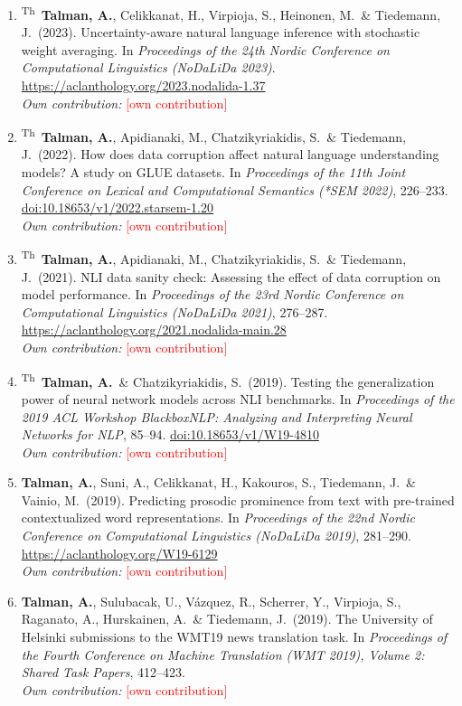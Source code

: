 \documentclass[12pt,a4paper]{article}
\newcommand{\fillin}[1]{\textcolor{red}{[#1]}}
\newcommand{\me}{\textbf{Talman, A.}}
\newcommand{\thesis}{\textsuperscript{Th}}    %
\newcommand{\contrib}[1]{\\\textit{Own contribution:} #1}
\begin{document}
\begin{enumerate}[resume*=pubs]
  \item \thesis\ \me, Celikkanat, H., Virpioja, S., Heinonen, M.\ \& Tiedemann, J.\ (2023). Uncertainty-aware natural language inference with stochastic weight averaging. In \emph{Proceedings of the 24th Nordic Conference on Computational Linguistics (NoDaLiDa 2023)}. \url{https://aclanthology.org/2023.nodalida-1.37}
  \contrib{\fillin{own contribution}}

  \item \thesis\ \me, Apidianaki, M., Chatzikyriakidis, S.\ \& Tiedemann, J.\ (2022). How does data corruption affect natural language understanding models? A study on GLUE datasets. In \emph{Proceedings of the 11th Joint Conference on Lexical and Computational Semantics (*SEM 2022)}, 226--233. \href{https://doi.org/10.18653/v1/2022.starsem-1.20}{doi:10.18653/v1/2022.starsem-1.20}
  \contrib{\fillin{own contribution}}

  \item \thesis\ \me, Apidianaki, M., Chatzikyriakidis, S.\ \& Tiedemann, J.\ (2021). NLI data sanity check: Assessing the effect of data corruption on model performance. In \emph{Proceedings of the 23rd Nordic Conference on Computational Linguistics (NoDaLiDa 2021)}, 276--287. \url{https://aclanthology.org/2021.nodalida-main.28}
  \contrib{\fillin{own contribution}}

  \item \thesis\ \me\ \& Chatzikyriakidis, S.\ (2019). Testing the generalization power of neural network models across NLI benchmarks. In \emph{Proceedings of the 2019 ACL Workshop BlackboxNLP: Analyzing and Interpreting Neural Networks for NLP}, 85--94. \href{https://doi.org/10.18653/v1/W19-4810}{doi:10.18653/v1/W19-4810}
  \contrib{\fillin{own contribution}}

  \item \me, Suni, A., Celikkanat, H., Kakouros, S., Tiedemann, J.\ \& Vainio, M.\ (2019). Predicting prosodic prominence from text with pre-trained contextualized word representations. In \emph{Proceedings of the 22nd Nordic Conference on Computational Linguistics (NoDaLiDa 2019)}, 281--290. \url{https://aclanthology.org/W19-6129}
  \contrib{\fillin{own contribution}}

  \item \me, Sulubacak, U., Vázquez, R., Scherrer, Y., Virpioja, S., Raganato, A., Hurskainen, A.\ \& Tiedemann, J.\ (2019). The University of Helsinki submissions to the WMT19 news translation task. In \emph{Proceedings of the Fourth Conference on Machine Translation (WMT 2019), Volume 2: Shared Task Papers}, 412--423.
  \contrib{\fillin{own contribution}}
\end{enumerate}
\end{document}
